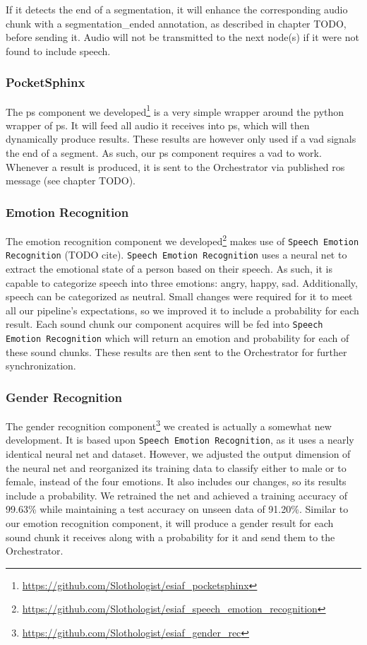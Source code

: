 If it detects the end of a segmentation, it will enhance the corresponding audio chunk with a segmentation\_ended annotation, as described in chapter TODO, before sending it.
Audio will not be transmitted to the next node(s) if it were not found to include speech.

\subsubsection{PocketSphinx}
\label{main:components:ps}
The \gls{ps} component we developed\footnote{\url{https://github.com/Slothologist/esiaf_pocketsphinx}} is a very simple wrapper around the python wrapper of \gls{ps}.
It will feed all audio it receives into \gls{ps}, which will then dynamically produce results.
These results are however only used if a \gls{vad} signals the end of a segment.
As such, our \gls{ps} component requires a \gls{vad} to work.
Whenever a result is produced, it is sent to the Orchestrator via published \gls{ros} message (see chapter TODO).

\subsubsection{Emotion Recognition}
\label{main:components:emotion}
The emotion recognition component we developed\footnote{\url{https://github.com/Slothologist/esiaf_speech_emotion_recognition}} makes use of \texttt{Speech Emotion Recognition} (TODO cite).
\texttt{Speech Emotion Recognition} uses a neural net to extract the emotional state of a person based on their speech.
As such, it is capable to categorize speech into three emotions: angry, happy, sad.
Additionally, speech can be categorized as neutral.
Small changes were required for it to meet all our pipeline's expectations, so we improved it to include a probability for each result. %
Each sound chunk our component acquires will be fed into \texttt{Speech Emotion Recognition} which will return an emotion and probability for each of these sound chunks.
These results are then sent to the Orchestrator for further synchronization.

\subsubsection{Gender Recognition}
\label{main:components:gender}
The gender recognition component\footnote{\url{https://github.com/Slothologist/esiaf_gender_rec}} we created is actually a somewhat new development.
It is based upon \texttt{Speech Emotion Recognition}, as it uses a nearly identical neural net and dataset.
However, we adjusted the output dimension of the neural net and reorganized its training data to classify either to male or to female, instead of the four emotions.
It also includes our changes, so its results include a probability.
We retrained the net and achieved a training accuracy of 99.63\% while maintaining a test accuracy on unseen data of 91.20\%.
Similar to our emotion recognition component, it will produce a gender result for each sound chunk it receives along with a probability for it and send them to the Orchestrator.

